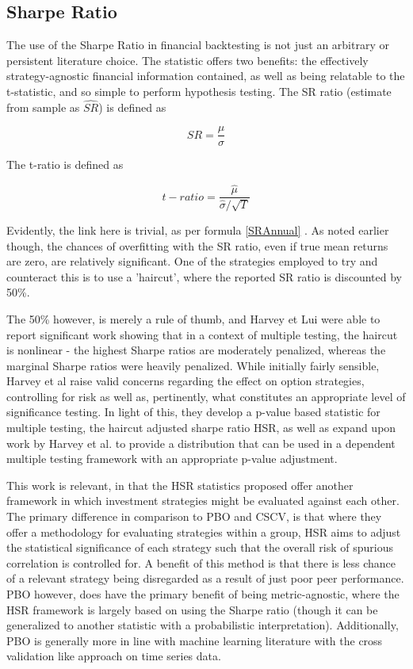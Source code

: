 \documentclass[a4paper,latin]{paper}
\begin{document}
\subsection {Sharpe Ratio}

The use of the Sharpe Ratio in financial backtesting is not just an arbitrary or persistent literature choice. 
The statistic offers two benefits: the effectively strategy-agnostic financial information contained, as well as being 
relatable to the t-statistic, and so simple to perform hypothesis testing. The SR ratio (estimate from sample as $\hat{SR}$) 
is defined as

\begin{equation}\label{SR}
  SR=\frac{\mu}{\sigma}
\end{equation}

The t-ratio is defined as 

\begin{equation}\label{tratio}
  t-ratio = \frac{\hat{\mu}}{\hat{\sigma}/\sqrt{T}}
\end{equation}

Evidently, the link here is trivial, as per formula \eqref{SRAnnual} . As noted earlier though, the chances of 
overfitting with the SR ratio, even if true mean returns are zero, are relatively significant. One of the strategies 
employed to try and counteract this is to use a 'haircut', where the reported SR ratio is discounted by 50\%. 
\hfill \break 

The 50\% however, is merely a rule of thumb, and Harvey et Lui \cite{Harvey} were able to report significant work showing 
that in a context of multiple testing, the haircut is nonlinear - the highest Sharpe ratios are moderately penalized, 
whereas the marginal Sharpe ratios were heavily penalized. While initially fairly sensible, Harvey et al raise valid 
concerns regarding the effect on option strategies, controlling for risk as well as, pertinently, what constitutes an 
appropriate level of significance testing. In light of this, they develop a p-value based statistic for multiple testing, 
the haircut adjusted sharpe ratio HSR, as well as expand upon work by Harvey et al. \cite{HLZ} to provide a distribution that can 
be used in a dependent multiple testing framework with an appropriate p-value adjustment.
\hfill \break 

This work is relevant, in that the HSR statistics proposed offer another framework in which investment strategies 
might be evaluated against each other. The primary difference in comparison to PBO and CSCV, is that where 
they offer a methodology for evaluating strategies within a group, HSR aims to adjust the statistical significance 
of each strategy such that the overall risk of spurious correlation is controlled for. A benefit of this method is that 
there is less chance of a relevant strategy being disregarded as a result of just poor peer performance. PBO 
however, does have the primary benefit of being metric-agnostic, where the HSR framework is largely based on 
using the Sharpe ratio (though it can be generalized to another statistic with a probabilistic interpretation). Additionally, 
PBO is generally more in line with machine learning literature with the cross validation like approach on time series data.  
\hfill \break 
\end{document}
